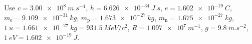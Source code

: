 \documentclass[12pt]{article}
\begin{document}
\begin{center}
  Use $c = \qty{3.00e8}{m.s^{-1}}$, $h = \qty{6.626e-34}{J.s}$, $e = \qty{1.602e-19}{C}$,
  $m_\mathrm{e} = \qty{9.109e-31}{kg}$, $m_\mathrm{p} = \qty{1.673e-27}{kg}$, $m_\mathrm{n} = \qty{1.675e-27}{kg}$,\\
  $\qty{1}{u} = \qty{1.661e-27}{kg} = \qty{931.5}{MeV}/c^2$, $R = \qty{1.097e7}{m^{-1}}$,
  $g = \qty{9.8}{m.s^{-2}}$, $\qty{1}{eV} = \qty{1.602e-19}{J}$.
\end{center}
\end{document}
